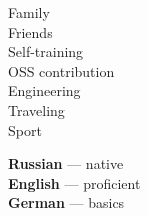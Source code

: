 \documentclass[11pt]{developercv} %
\begin{document}
\vspace{1.5cm}
\hfill
\begin{minipage}[t]{0.3\textwidth}
  \vspace{-\baselineskip} %


  Family\\
  Friends\\
  Self-training\\
  OSS contribution\\
  Engineering\\
  Traveling\\
  Sport\\
\end{minipage}
\hfill
\begin{minipage}[t]{0.3\textwidth}
  \vspace{-\baselineskip} %


  \textbf{Russian} --- native\\
  \textbf{English} --- proficient\\
  \textbf{German} --- basics\\
\end{minipage}
\hfill

\end{document}
